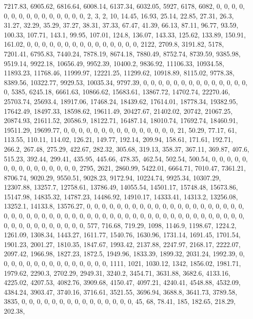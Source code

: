 \documentclass[
]{article}
\begin{document}
7217.83, 6905.62, 6816.64, 6008.14, 6137.34, 6032.05, 5927, 6178, 6082,
0, 0, 0, 0, 0, 0, 0, 0, 0, 0, 0, 0, 0, 0, 0, 2, 3, 2, 10, 14.45, 16.93,
25.14, 22.85, 27.31, 26.3, 31.27, 32.29, 35.29, 37.27, 38.31, 37.33,
67.47, 41.39, 66.13, 87.11, 96.77, 93.59, 100.33, 107.71, 143.1, 99.95,
107.01, 124.8, 136.07, 143.33, 125.62, 133.89, 150.91, 161.02, 0, 0, 0,
0, 0, 0, 0, 0, 0, 0, 0, 0, 0, 0, 0, 2122, 2709.8, 3191.82, 5178,
7201.41, 6795.83, 7440.24, 7878.19, 8674.18, 7880.49, 8752.74, 8739.59,
9385.98, 9519.14, 9922.18, 10656.49, 9952.39, 10400.2, 9836.92,
11106.33, 10934.58, 11893.23, 11768.46, 11999.97, 12221.25, 11299.62,
10918.89, 8115.02, 9778.38, 8389.56, 10322.77, 9929.53, 10035.34,
9797.39, 0, 0, 0, 0, 0, 0, 0, 0, 0, 0, 0, 0, 0, 0, 0, 5385, 6245.18,
6661.63, 10866.62, 15683.61, 13867.72, 14702.74, 22270.46, 25703.74,
25693.4, 18917.06, 17468.24, 18439.62, 17614.01, 18778.34, 19382.95,
17642.49, 18497.33, 18598.62, 19611.49, 20427.67, 21402.02, 20742,
21067.25, 20874.93, 21611.52, 20586.9, 18122.71, 16487.14, 18010.74,
17692.74, 18460.91, 19511.29, 19699.77, 0, 0, 0, 0, 0, 0, 0, 0, 0, 0, 0,
0, 0, 0, 0, 21, 50.29, 77.17, 61, 113.55, 110.11, 114.02, 126.21,
149.77, 192.14, 209.94, 158.61, 171.61, 192.71, 266.2, 267.48, 275.29,
422.67, 282.32, 305.68, 319.13, 358.37, 367.11, 369.87, 407.6, 515.23,
392.44, 299.41, 435.95, 445.66, 478.35, 462.54, 502.54, 500.54, 0, 0, 0,
0, 0, 0, 0, 0, 0, 0, 0, 0, 0, 0, 0, 2795, 2621, 2860.99, 5422.01,
6664.71, 7010.47, 7361.21, 8706.74, 9020.29, 9550.51, 9028.23, 9172.94,
10224.74, 9925.34, 10307.29, 12307.88, 13257.7, 12758.61, 13786.49,
14055.54, 14501.17, 15748.48, 15673.86, 15147.98, 14835.32, 14787.23,
14486.92, 14910.17, 14333.41, 14313.2, 13256.08, 13252.1, 14133.8,
13576.27, 0, 0, 0, 0, 0, 0, 0, 0, 0, 0, 0, 0, 0, 0, 0, 0, 0, 0, 0, 0, 0,
0, 0, 0, 0, 0, 0, 0, 0, 0, 0, 0, 0, 0, 0, 0, 0, 0, 0, 0, 0, 0, 0, 0, 0,
0, 0, 0, 0, 0, 0, 0, 0, 0, 0, 0, 0, 0, 0, 0, 0, 0, 0, 0, 577, 716.68,
719.29, 1098, 1146.9, 1198.67, 1224.2, 1261.09, 1308.34, 1443.27,
1611.77, 1540.76, 1630.96, 1731.14, 1691.45, 1701.54, 1901.23, 2001.27,
1810.35, 1847.67, 1993.42, 2137.88, 2247.97, 2168.17, 2222.07, 2097.42,
1966.98, 1827.23, 1872.5, 1949.96, 1833.39, 1899.32, 2031.24, 1992.39,
0, 0, 0, 0, 0, 0, 0, 0, 0, 0, 0, 0, 0, 0, 0, 1111, 1021, 1030.12, 1342,
1856.02, 1981.71, 1979.62, 2290.3, 2702.29, 2949.31, 3240.2, 3454.71,
3631.88, 3682.6, 4133.16, 4225.02, 4207.53, 4082.76, 3909.68, 4150.47,
4097.21, 4240.41, 4548.88, 4532.09, 4384.24, 3903.47, 3740.16, 3716.61,
3521.55, 3696.94, 3688.8, 3641.73, 3789.58, 3835, 0, 0, 0, 0, 0, 0, 0,
0, 0, 0, 0, 0, 0, 0, 0, 45, 68, 78.41, 185, 182.65, 218.29, 202.38,
\end{document}
